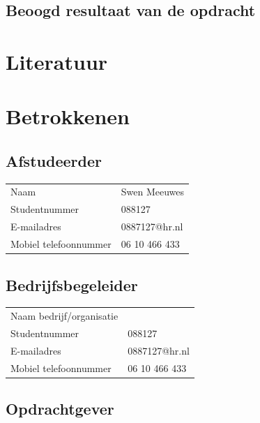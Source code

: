 \documentclass{report}
\makeatletter
\newcommand{\name}{Swen Meeuwes}
\newcommand{\studentnumber}{088127}
\newcommand{\email}{0887127@hr.nl}
\newcommand{\mobilephone}{06 10 466 433}
\makeatother
\begin{document}
\section{Beoogd resultaat van de opdracht}


\chapter{Literatuur}






\chapter{Betrokkenen}

\section*{Afstudeerder}
\begin{table}[h]
\begin{tabular}{ll}
Naam & \name \\
Studentnummer & \studentnumber \\
E-mailadres & \email \\
Mobiel telefoonnummer & \mobilephone
\end{tabular}
\end{table}

\section*{Bedrijfsbegeleider}
\begin{table}[h]
\begin{tabular}{ll}
Naam bedrijf/organisatie &  \\
Studentnummer & \studentnumber \\
E-mailadres & \email \\
Mobiel telefoonnummer & \mobilephone
\end{tabular}
\end{table}

\section*{Opdrachtgever}
\end{document}
